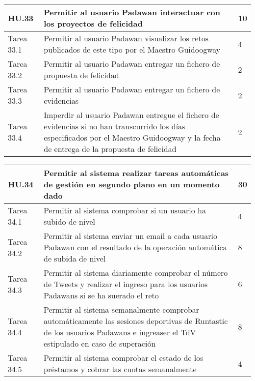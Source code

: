 \begin{table}[h]
	\centering
	\begin{tabular}{| p{2.3cm} | p{6.7cm} | p{2cm} |}
		\rowcolor[HTML]{329A9D} 
		{\color[HTML]{FFFFFF} \textbf{HU.33}} & {\color[HTML]{FFFFFF} \textbf{Permitir al usuario Padawan interactuar con los proyectos de felicidad}} & {\color[HTML]{FFFFFF} \textbf{10}}  \\ \hline
		Tarea 33.1 & Permitir al usuario Padawan visualizar los retos publicados de este tipo por el Maestro Guidoogway & 4 \\ \hline
		Tarea 33.2 & Permitir al usuario Padawan entregar un fichero de propuesta de felicidad & 2 \\ \hline
		Tarea 33.3 & Permitir al usuario Padawan entregar un fichero de evidencias & 2 \\ \hline
		Tarea 33.4 & Imperdir al usuario Padawan entregue el fichero de evidencias si no han transcurrido los días especificados por el Maestro Guidoogway y la fecha de entrega de la propuesta de felicidad & 2 \\ \hline
	\end{tabular}
\end{table}

\newpage

\begin{table}[h]
	\centering
	\begin{tabular}{| p{2.3cm} | p{6.7cm} | p{2cm} |}
		\rowcolor[HTML]{329A9D} 
		{\color[HTML]{FFFFFF} \textbf{HU.34}} & {\color[HTML]{FFFFFF} \textbf{Permitir al sistema realizar tareas automáticas de gestión en segundo plano en un momento dado}} & {\color[HTML]{FFFFFF} \textbf{30}}  \\ \hline
		Tarea 34.1 & Permitir al sistema comprobar si un usuario ha subido de nivel & 4 \\ \hline
		Tarea 34.2 & Permitir al sistema enviar un email a cada usuario Padawan con el resultado de la operación automática de subida de nivel & 8 \\ \hline
		Tarea 34.3 & Permitir al sistema diariamente comprobar el número de Tweets y realizar el ingreso para los usuarios Padawans si se ha suerado el reto& 6 \\ \hline
		Tarea 34.4 & Permitir al sistema semanalmente comprobar automáticamente las sesiones deportivas de Runtastic de los usuarios Padawans e ingreaser el TdV estipulado en caso de superación  & 8 \\ \hline
		Tarea 34.5 & Permitir al sistema comprobar el estado de los préstamos y cobrar las cuotas semanalmente & 4 \\ \hline
	\end{tabular}
\end{table}

